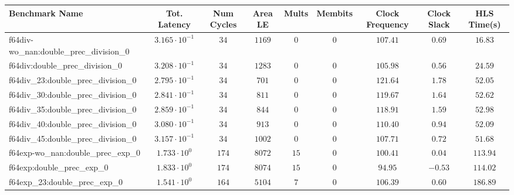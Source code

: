 \begin{tabular}{|l|c|c|c|c|c|c|c|c|}
\hline
Benchmark Name                                 & Tot. Latency            & Num Cycles & Area LE    & Mults   & Membits & Clock Frequency & Clock Slack & HLS Time(s) \\
\hline
f64div-wo\_nan:double\_prec\_division\_0       & $ 3.165 \cdot 10^{-1} $ & $ 34     $ & $ 1169   $ & $ 0   $ & $ 0   $ & $ 107.41      $ & $ 0.69    $ & $ 16.83   $ \\
f64div:double\_prec\_division\_0               & $ 3.208 \cdot 10^{-1} $ & $ 34     $ & $ 1283   $ & $ 0   $ & $ 0   $ & $ 105.98      $ & $ 0.56    $ & $ 24.59   $ \\
f64div\_23:double\_prec\_division\_0           & $ 2.795 \cdot 10^{-1} $ & $ 34     $ & $ 701    $ & $ 0   $ & $ 0   $ & $ 121.64      $ & $ 1.78    $ & $ 52.05   $ \\
f64div\_30:double\_prec\_division\_0           & $ 2.841 \cdot 10^{-1} $ & $ 34     $ & $ 811    $ & $ 0   $ & $ 0   $ & $ 119.67      $ & $ 1.64    $ & $ 52.62   $ \\
f64div\_35:double\_prec\_division\_0           & $ 2.859 \cdot 10^{-1} $ & $ 34     $ & $ 844    $ & $ 0   $ & $ 0   $ & $ 118.91      $ & $ 1.59    $ & $ 52.98   $ \\
f64div\_40:double\_prec\_division\_0           & $ 3.080 \cdot 10^{-1} $ & $ 34     $ & $ 913    $ & $ 0   $ & $ 0   $ & $ 110.40      $ & $ 0.94    $ & $ 52.09   $ \\
f64div\_45:double\_prec\_division\_0           & $ 3.157 \cdot 10^{-1} $ & $ 34     $ & $ 1002   $ & $ 0   $ & $ 0   $ & $ 107.71      $ & $ 0.72    $ & $ 51.68   $ \\
f64exp-wo\_nan:double\_prec\_exp\_0            & $ 1.733 \cdot 10^{0}  $ & $ 174    $ & $ 8072   $ & $ 15  $ & $ 0   $ & $ 100.41      $ & $ 0.04    $ & $ 113.94  $ \\
f64exp:double\_prec\_exp\_0                    & $ 1.833 \cdot 10^{0}  $ & $ 174    $ & $ 8074   $ & $ 15  $ & $ 0   $ & $ 94.95       $ & $ -0.53   $ & $ 114.02  $ \\
f64exp\_23:double\_prec\_exp\_0                & $ 1.541 \cdot 10^{0}  $ & $ 164    $ & $ 5104   $ & $ 7   $ & $ 0   $ & $ 106.39      $ & $ 0.60    $ & $ 186.89  $ \\

\end{tabular}
